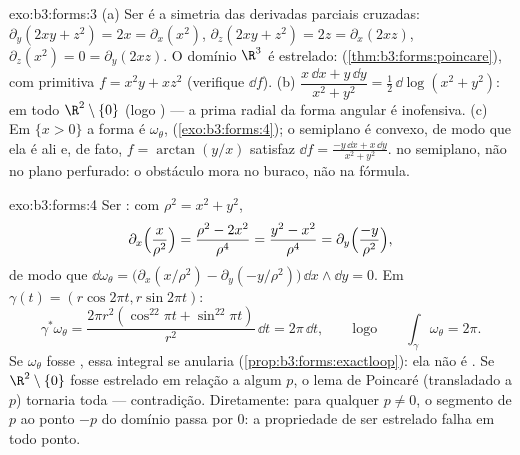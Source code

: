 \begin{solution}{exo:b3:forms:3}
(a) Ser  é a simetria das derivadas parciais cruzadas:
$\partial_y(2xy + z^2) = 2x = \partial_x(x^2)$,
$\partial_z(2xy + z^2) = 2z = \partial_x(2xz)$,
$\partial_z(x^2) = 0 = \partial_y(2xz)$. O domínio $\R^3$
é estrelado:  (\cref{thm:b3:forms:poincare}), com
primitiva $f = x^2y + xz^2$ (verifique $\dd f$).
(b) $\dfrac{x\,\dd x + y\,\dd y}{x^2 + y^2} =
\tfrac12\,\dd\log(x^2 + y^2)$:  em todo
$\R^2\setminus\{0\}$ (logo ) --- a prima radial
da forma angular é inofensiva.
(c) Em $\{x > 0\}$ a forma é $\omega_\theta$, 
(\cref{exo:b3:forms:4}); o semiplano é convexo, de modo que ela é
 ali e, de fato, $f = \arctan(y/x)$ satisfaz $\dd f
= \frac{-y\,\dd x + x\,\dd y}{x^2 + y^2}$.  no
semiplano, não  no plano perfurado: o
obstáculo mora no buraco, não na fórmula.
\end{solution}

\begin{solution}{exo:b3:forms:4}
Ser : com $\rho^2 = x^2 + y^2$,
\[
\partial_x\Bigl(\frac{x}{\rho^2}\Bigr) = \frac{\rho^2 -
2x^2}{\rho^4} = \frac{y^2 - x^2}{\rho^4} =
\partial_y\Bigl(\frac{-y}{\rho^2}\Bigr),
\]
de modo que $\dd\omega_\theta = \bigl(\partial_x(x/\rho^2) -
\partial_y(-y/\rho^2)\bigr)\,\dd x\wedge\dd y = 0$. Em
$\gamma(t) = (r\cos2\pi t, r\sin2\pi t)$:
\[
\gamma^*\omega_\theta = \frac{2\pi r^2(\cos^22\pi t +
\sin^22\pi t)}{r^2}\,\dd t = 2\pi\,\dd t,
\qquad\text{logo}\qquad
\int_\gamma\omega_\theta = 2\pi .
\] Se $\omega_\theta$ fosse
, essa integral se anularia
(\cref{prop:b3:forms:exactloop}): ela não é . Se
$\R^2\setminus\{0\}$ fosse estrelado em relação a algum $p$,
o lema de Poincaré (transladado a $p$) tornaria  toda  --- contradição. Diretamente: para qualquer $p
\neq 0$, o segmento de $p$ ao ponto $-p$ do
domínio passa por $0$: a propriedade de ser estrelado falha em todo
ponto.
\end{solution}

